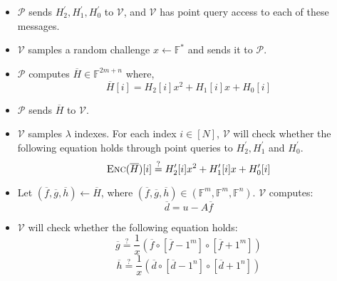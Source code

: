 \begin{itemize}
    \item $\mathcal{P}$ sends $H_2^\prime, H_1^\prime, H_0^\prime$ to $\mathcal{V}$, and $\mathcal{V}$ has point query access to each of these messages.
    
    \item $\mathcal{V}$ samples a random challenge $x \leftarrow \mathbb{F}^*$ and sends it to $\mathcal{P}$.
    
    \item $\mathcal{P}$ computes $\overline{H} \in \mathbb{F}^{2m+n}$ where,
$$
    \overline{H}[i] = H_2[i] x^2 + H_1[i] x + H_0[i] 
$$

    \item $\mathcal{P}$ sends $\overline{H}$ to $\mathcal{V}$.

    \item $\mathcal{V}$ samples $\lambda$ indexes. For each index $i \in [N]$, $\mathcal{V}$ will check whether the following equation holds through point queries to $H_2^\prime, H_1^\prime$ and $H_0^\prime$.
\begin{equation}
\label{eq:lwe5}
    \textsc{Enc}(\overline{H})[i] 
    \stackrel{?}{=} 
    H_2^\prime[i] x^2 + H_1^\prime[i] x + H_0^\prime[i]
\end{equation}



    \item Let $(\overline{f}, \overline{g}, \overline{h}) \leftarrow \overline{H}$, where $(\overline{f}, \overline{g}, \overline{h}) \in (\mathbb{F}^m, \mathbb{F}^m, \mathbb{F}^n)$. 
    $\mathcal{V}$ computes: 
$$
    \overline{d} = u - A\overline{f}
$$
    
    \item $\mathcal{V}$ will check whether the following equation holds:
\begin{equation}
\label{eq:lwe6}
    \overline{g} \overset{?}{=} \frac{1}{x} (\overline{f} \circ [\overline{f} - 1^m] \circ [\overline{f} + 1^m])
\end{equation}
\begin{equation}
\label{eq:lwe7}
    \overline{h} \overset{?}{=} \frac{1}{x} (\overline{d} \circ [\overline{d} - 1^n] \circ [\overline{d} + 1^n])
\end{equation}
    

\end{itemize}

